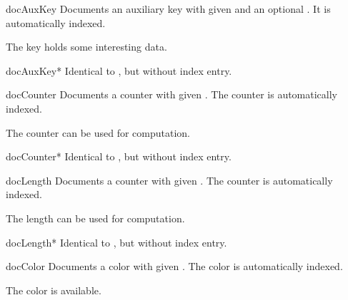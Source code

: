 \clearpage

\begin{docCommand}{docAuxKey}{}
  Documents an auxiliary key with given  and an optional .
  It is automatically indexed.
\begin{dispExample}
The key  holds some interesting data.
\end{dispExample}
\end{docCommand}


\begin{docCommand}{docAuxKey*}{}
  Identical to , but without index entry.
\end{docCommand}


\begin{docCommand}[doc new=2015-01-08]{docCounter}{}
  Documents a counter with given . The counter is automatically indexed.
\begin{dispExample}
The counter  can be used for computation.
\end{dispExample}
\end{docCommand}

\begin{docCommand}[doc new=2015-01-08]{docCounter*}{}
  Identical to , but without index entry.
\end{docCommand}

\begin{docCommand}[doc new=2015-01-08]{docLength}{}
  Documents a counter with given . The counter is automatically indexed.
\begin{dispExample}
The length  can be used for computation.
\end{dispExample}
\end{docCommand}

\begin{docCommand}[doc new=2015-01-08]{docLength*}{}
  Identical to , but without index entry.
\end{docCommand}


\begin{docCommand}{docColor}{}
  Documents a color with given . The color is automatically indexed.
\begin{dispExample}
The color  is available.
\end{dispExample}
\end{docCommand}

